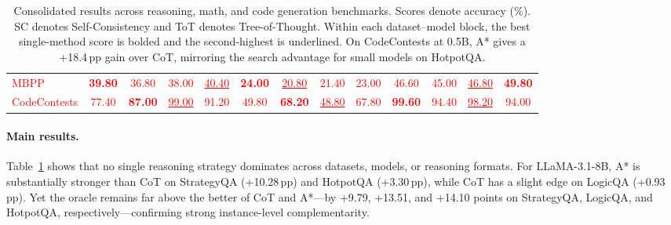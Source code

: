 \documentclass[10pt]{article}
\begin{document}
\begin{table}[t]
{\begin{tabular}{lcccc|cccc|cccc}
\textcolor{red}{MBPP}
& \textcolor{red}{\textbf{39.80}} & \textcolor{red}{36.80} & \textcolor{red}{38.00} & \textcolor{red}{\underline{40.40}}
& \textcolor{red}{\textbf{24.00}} & \textcolor{red}{\underline{20.80}} & \textcolor{red}{21.40} & \textcolor{red}{23.00}
& \textcolor{red}{46.60} & \textcolor{red}{45.00} & \textcolor{red}{\underline{46.80}} & \textcolor{red}{\textbf{49.80}} \\

\textcolor{red}{CodeContests}
& \textcolor{red}{77.40} & \textcolor{red}{\textbf{87.00}} & \textcolor{red}{\underline{99.00}} & \textcolor{red}{91.20}
& \textcolor{red}{49.80} & \textcolor{red}{\textbf{68.20}} & \textcolor{red}{\underline{48.80}} & \textcolor{red}{67.80}
& \textcolor{red}{\textbf{99.60}} & \textcolor{red}{94.40} & \textcolor{red}{\underline{98.20}} & \textcolor{red}{94.00} \\
\bottomrule
\end{tabular}
}
\caption{Consolidated results across reasoning, math, and code generation benchmarks. Scores denote accuracy (\%). SC denotes Self-Consistency and ToT denotes Tree-of-Thought. Within each dataset--model block, the best single-method score is bolded and the second-highest is underlined. On CodeContests at 0.5B, A* gives a +18.4\,pp gain over CoT, mirroring the search advantage for small models on HotpotQA.}
\label{tab:consolidated-main-results}
\end{table}




\paragraph{Main results.}
Table~\ref{tab:consolidated-main-results} shows that no single reasoning strategy dominates across datasets, models, or reasoning formats. For LLaMA-3.1-8B, A* is substantially stronger than CoT on StrategyQA (+10.28\,pp) and HotpotQA (+3.30\,pp), while CoT has a slight edge on LogicQA (+0.93\,pp). Yet the oracle remains far above the better of CoT and A*---by +9.79, +13.51, and +14.10 points on StrategyQA, LogicQA, and HotpotQA, respectively---confirming strong instance-level complementarity. 
\end{document}
